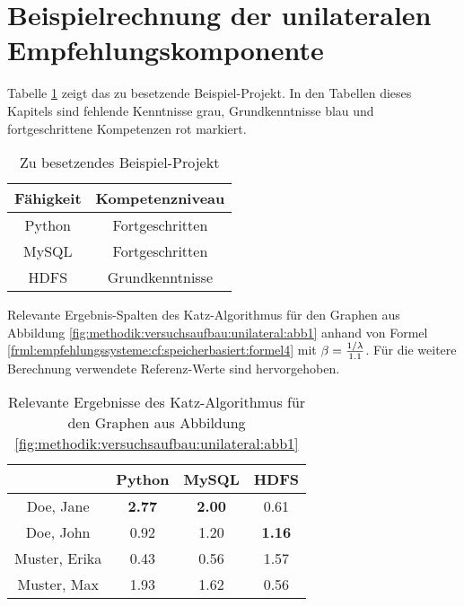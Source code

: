 \section{Beispielrechnung der unilateralen Empfehlungskomponente}
\label{ch:nebenrechnungen:unilateral}
Tabelle \ref{tbl:berechnungDerKatzZentralitaetPseudoMitarbeiter:tbl1} zeigt das zu besetzende Beispiel-Projekt. In den Tabellen dieses Kapitels sind fehlende Kenntnisse grau, Grundkenntnisse blau und fortgeschrittene Kompetenzen rot markiert.
\begin{table}[h]
	\centering
	\begin{tabular}{c|c}
		Fähigkeit & Kompetenzniveau \\
		\hline
		Python  & \cellcolor{usercolor}Fortgeschritten\\
		MySQL   & \cellcolor{usercolor}Fortgeschritten\\
		HDFS    & \cellcolor{itemcolor}Grundkenntnisse
	\end{tabular}
	\caption{Zu besetzendes Beispiel-Projekt}
	\label{tbl:berechnungDerKatzZentralitaetPseudoMitarbeiter:tbl1}
\end{table}

Relevante Ergebnis-Spalten des Katz-Algorithmus für den Graphen aus Abbildung \ref{fig:methodik:versuchsaufbau:unilateral:abb1} anhand von Formel \ref{frml:empfehlungssysteme:cf:speicherbasiert:formel4} mit $\beta = \frac{1/\lambda}{1.1}$. Für die weitere Berechnung verwendete Referenz-Werte sind hervorgehoben.

\begin{table}[h]
	\centering
	\begin{tabular}{c|c|c|c}
		& Python & MySQL & HDFS\\ 
		\hline
		Doe, Jane     & \cellcolor{usercolor}\textbf{2.77} & \cellcolor{itemcolor}\textbf{2.00} & \cellcolor{exxetagray}0.61\\
		Doe, John     & \cellcolor{exxetagray}0.92 & \cellcolor{itemcolor}1.20 & \cellcolor{itemcolor}\textbf{1.16}\\
		Muster, Erika & \cellcolor{exxetagray}0.43 & \cellcolor{exxetagray}0.56 & \cellcolor{usercolor}1.57\\
		Muster, Max   & \cellcolor{itemcolor}1.93 & \cellcolor{itemcolor}1.62 & \cellcolor{exxetagray}0.56
	\end{tabular}
	\caption{Relevante Ergebnisse des Katz-Algorithmus für den Graphen aus Abbildung \ref{fig:methodik:versuchsaufbau:unilateral:abb1}}
	\label{tbl:berechnungDerKatzZentralitaetPseudoMitarbeiter:tbl2}
\end{table}

